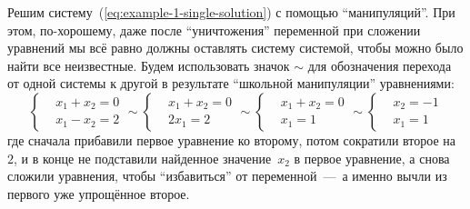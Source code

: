 \documentclass[a4paper,12pt]{article}
\begin{document}
  Решим систему~(\ref{eq:example-1-single-solution}) с помощью ``манипуляций''.
  При этом, по-хорошему, даже после ``уничтожения'' переменной при сложении уравнений мы всё равно должны оставлять систему системой, чтобы можно было найти все неизвестные.
  Будем использовать значок $\sim$ для обозначения перехода от одной системы к другой в результате ``школьной манипуляции'' уравнениями:
  \begin{equation}\label{eq:example-1-solving}
    \left\{
      \begin{aligned}
        &x_1 + x_2 = 0\\
        &x_1 - x_2 = 2
      \end{aligned}
    \right.
    \sim\left\{
      \begin{aligned}
        &x_1 + x_2 = 0\\
        &2x_1 = 2
      \end{aligned}
    \right.
    \sim\left\{
      \begin{aligned}
        &x_1 + x_2 = 0\\
        &x_1 = 1
      \end{aligned}
    \right.
    \sim\left\{
      \begin{aligned}
        &x_2 = -1\\
        &x_1 = 1
      \end{aligned}
    \right.
  \end{equation}
  где сначала прибавили первое уравнение ко второму, потом сократили второе на~$2$, и в конце не подставили найденное значение~$x_2$ в первое уравнение, а снова сложили уравнения, чтобы ``избавиться'' от переменной~---~а именно вычли из первого уже упрощённое второе.
\end{document}
